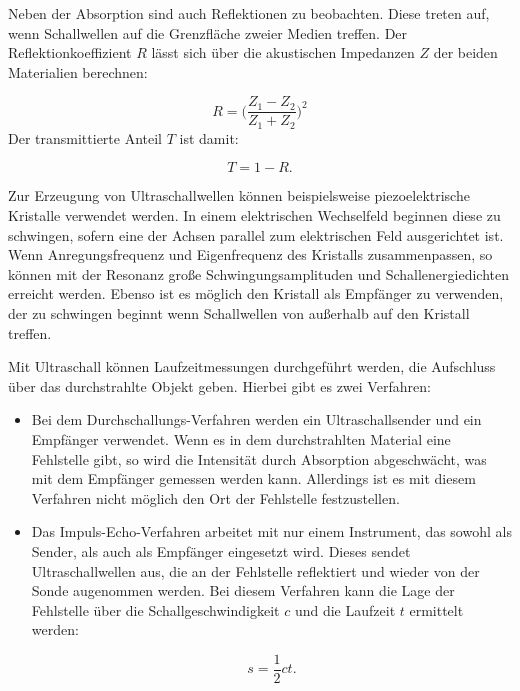 Neben der Absorption sind auch Reflektionen zu beobachten. Diese treten auf, wenn Schallwellen auf die Grenzfläche zweier Medien treffen. Der Reflektionkoeffizient $R$ lässt sich über die akustischen Impedanzen $Z$ der beiden Materialien
berechnen:

\begin{equation}
R = \biggl(\frac{Z_1 - Z_2}{Z_1 + Z_2}\biggr)^2
\end{equation}
Der transmittierte Anteil $T$ ist damit:

\begin{equation}
T = 1 - R.
\end{equation}

Zur Erzeugung von Ultraschallwellen können beispielsweise piezoelektrische Kristalle verwendet werden. In einem elektrischen Wechselfeld beginnen diese zu schwingen, sofern eine der Achsen parallel zum elektrischen Feld ausgerichtet ist.
Wenn Anregungsfrequenz und Eigenfrequenz des Kristalls zusammenpassen, so können mit der Resonanz große Schwingungsamplituden und Schallenergiedichten erreicht werden. Ebenso ist es möglich den Kristall als Empfänger zu verwenden, der 
zu schwingen beginnt wenn Schallwellen von außerhalb auf den Kristall treffen. 

Mit Ultraschall können Laufzeitmessungen durchgeführt werden, die Aufschluss über das durchstrahlte Objekt geben. Hierbei gibt es zwei Verfahren:

\begin{itemize}
  \item Bei dem Durchschallungs-Verfahren werden ein Ultraschallsender und ein Empfänger verwendet. Wenn es in dem durchstrahlten Material eine Fehlstelle gibt, so wird die Intensität durch Absorption abgeschwächt, was mit dem Empfänger 
  gemessen werden kann. Allerdings ist es mit diesem Verfahren nicht möglich den Ort der Fehlstelle festzustellen.
  \item Das Impuls-Echo-Verfahren arbeitet mit nur einem Instrument, das sowohl als Sender, als auch als Empfänger eingesetzt wird. Dieses sendet Ultraschallwellen aus, die an der Fehlstelle reflektiert und wieder von der Sonde augenommen
  werden. Bei diesem Verfahren kann die Lage der Fehlstelle über die Schallgeschwindigkeit $c$ und die Laufzeit $t$ ermittelt werden:
  
  \begin{equation}
  s = \frac{1}{2} c t.
  \end{equation}
\end{itemize}


